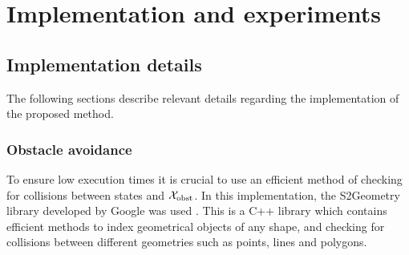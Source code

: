 \chapter{Implementation and experiments}\label{cha:results}

\section{Implementation details}
The following sections describe relevant details regarding the implementation of the proposed method.

\subsection{Obstacle avoidance}
To ensure low execution times it is crucial to use an efficient method of checking for collisions between states and $\mathcal{X}_{\text{obst}}$. 
In this implementation, the S2Geometry library developed by Google was used \cite{s2geo}. This is a C++ library which contains 
efficient methods to index geometrical objects of any shape, and checking for collisions between different geometries such as points, lines and polygons. 

